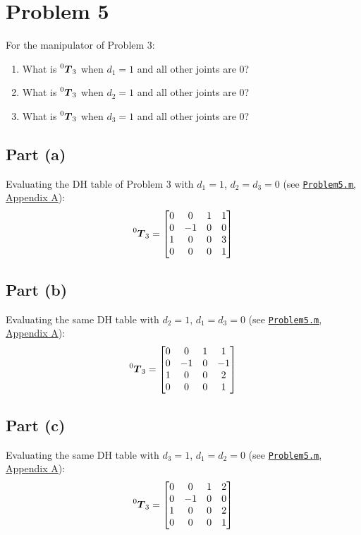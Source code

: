 \documentclass[11pt]{article}
\newcommand{\T}{\bm{T}}
\begin{document}
\newpage
\section*{Problem 5}

\begin{statement}
For the manipulator of Problem 3:
\begin{enumerate}[label=(\alph*), leftmargin=1.6em, itemsep=2pt]
    \item What is $\prescript{0}{}{\T}_3$ when $d_1 = 1$ and all other joints are $0$?
    \item What is $\prescript{0}{}{\T}_3$ when $d_2 = 1$ and all other joints are $0$?
    \item What is $\prescript{0}{}{\T}_3$ when $d_3 = 1$ and all other joints are $0$?
\end{enumerate}
\end{statement}

\subsection*{Part (a)}
Evaluating the DH table of Problem 3 with $d_1 = 1$, $d_2 = d_3 = 0$ (see \hyperref[app:code:problem5]{\texttt{Problem5.m}, Appendix A}):
\[
\prescript{0}{}{\T}_3 =
\begin{bmatrix}
0 & 0 & 1 & 1 \\
0 & -1 & 0 & 0 \\
1 & 0 & 0 & 3 \\
0 & 0 & 0 & 1
\end{bmatrix}
\]

\subsection*{Part (b)}
Evaluating the same DH table with $d_2 = 1$, $d_1 = d_3 = 0$ (see \hyperref[app:code:problem5]{\texttt{Problem5.m}, Appendix A}):
\[
\prescript{0}{}{\T}_3 =
\begin{bmatrix}
0 & 0 & 1 & 1 \\
0 & -1 & 0 & -1 \\
1 & 0 & 0 & 2 \\
0 & 0 & 0 & 1
\end{bmatrix}
\]

\subsection*{Part (c)}
Evaluating the same DH table with $d_3 = 1$, $d_1 = d_2 = 0$ (see \hyperref[app:code:problem5]{\texttt{Problem5.m}, Appendix A}):
\[
\prescript{0}{}{\T}_3 =
\begin{bmatrix}
0 & 0 & 1 & 2 \\
0 & -1 & 0 & 0 \\
1 & 0 & 0 & 2 \\
0 & 0 & 0 & 1
\end{bmatrix}
\]
\end{document}

